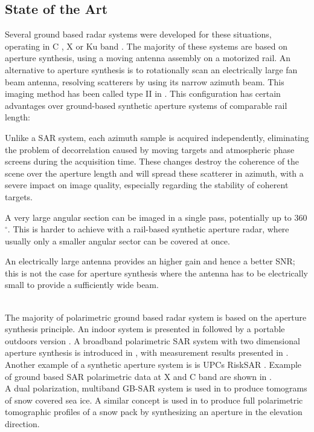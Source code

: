 \subsection{State of the Art}
Several ground based radar systems were developed for these situations, operating in C \cite{Leva2003, Rudolf1999a,Kang2009}, X \cite{Aguasca2004,Pipia2007a} or Ku band \cite{Leva2003, Rudolf1999a,Werner2008, Rodelsperger2012}. The majority of these systems are based on aperture synthesis, using a moving antenna assembly on a motorized rail. 
An alternative to aperture synthesis is to rotationally scan an electrically large fan beam antenna, resolving  scatterers by using its narrow azimuth beam\cite{Werner2008,werner_gpri_2012}. This imaging method has been called type II in \cite{Caduff2015}. 
This configuration has certain advantages over ground-based synthetic aperture systems\cite{Monserrat2014} of comparable rail length: \begin{enumerate*}
  \item Unlike a SAR system, each azimuth sample is 
acquired independently, eliminating the problem of decorrelation caused by moving targets and atmospheric phase screens during the acquisition time. 
These changes destroy the coherence of the scene over the aperture length and will spread these scatterer in azimuth, with a severe impact on image quality, especially regarding the stability of coherent targets.\\
 \item A very large 
angular section can be imaged in a single pass, potentially up to 360$^{\circ}$. This is harder to achieve with a rail-based synthetic aperture radar, where usually only a smaller angular sector
can be covered at once.\\
\item An electrically large antenna provides an higher gain and hence a better SNR; this is not the case for  aperture synthesis  where the antenna has to be electrically small to provide a sufficiently wide beam.\\
\end{enumerate*}\\
The majority of polarimetric ground based radar system is based on the aperture synthesis principle. An indoor system is presented in \cite{Bennett1996} followed by a portable outdoors version \cite{Bennett2000}. A broadband polarimetric SAR system with two dimensional aperture synthesis is introduced in \cite{Zhou2004}, with measurement results presented in \cite{Hamasaki2005}.
Another example  of a synthetic aperture system is is UPCs RiskSAR \cite{Iglesias2014, Aguasca2004,Pipia2007a,Pipia2009, Pipia2013,Iglesias2014}. Example of ground based SAR polarimetric data at X and C band are shown in \cite{Kang2009, Kang2010}.\\ A dual polarization, multiband GB-SAR system is used in \cite{Yitayew2014} to produce tomograms of snow covered sea ice. A similar concept is used in\cite{Frey2015,Frey2016} to produce full polarimetric tomographic profiles of a snow pack by synthesizing an aperture in the elevation direction.\\
